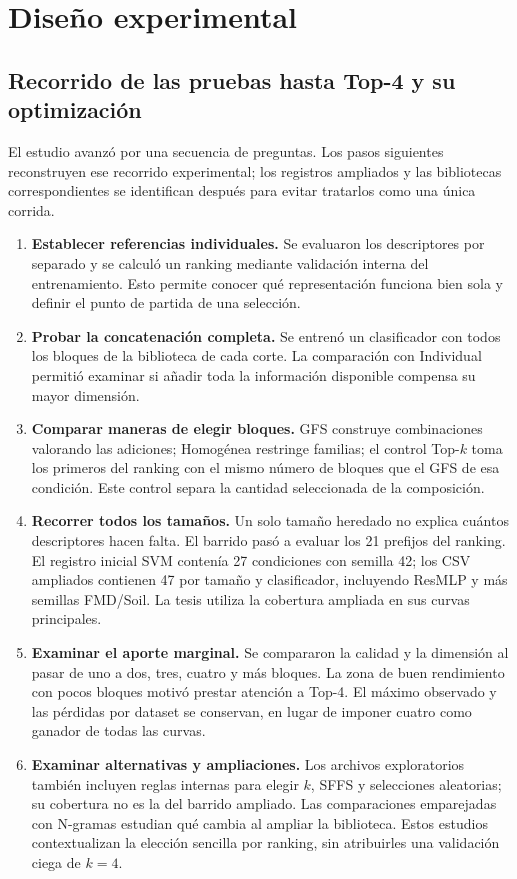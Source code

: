 \chapter{Diseño experimental}\label{sec:diseno}

\section{Recorrido de las pruebas hasta Top-4 y su optimización}
El estudio avanzó por una secuencia de preguntas. Los pasos siguientes reconstruyen ese recorrido experimental; los registros ampliados y las bibliotecas correspondientes se identifican después para evitar tratarlos como una única corrida.
\begin{enumerate}
\item \textbf{Establecer referencias individuales.} Se evaluaron los descriptores por separado y se calculó un ranking mediante validación interna del entrenamiento. Esto permite conocer qué representación funciona bien sola y definir el punto de partida de una selección.
\item \textbf{Probar la concatenación completa.} Se entrenó un clasificador con todos los bloques de la biblioteca de cada corte. La comparación con Individual permitió examinar si añadir toda la información disponible compensa su mayor dimensión.
\item \textbf{Comparar maneras de elegir bloques.} GFS construye combinaciones valorando las adiciones; Homogénea restringe familias; el control Top-\(k\) toma los primeros del ranking con el mismo número de bloques que el GFS de esa condición. Este control separa la cantidad seleccionada de la composición.
\item \textbf{Recorrer todos los tamaños.} Un solo tamaño heredado no explica cuántos descriptores hacen falta. El barrido pasó a evaluar los 21 prefijos del ranking. El registro inicial SVM contenía 27 condiciones con semilla 42; los CSV ampliados contienen 47 por tamaño y clasificador, incluyendo ResMLP y más semillas FMD/Soil. La tesis utiliza la cobertura ampliada en sus curvas principales.
\item \textbf{Examinar el aporte marginal.} Se compararon la calidad y la dimensión al pasar de uno a dos, tres, cuatro y más bloques. La zona de buen rendimiento con pocos bloques motivó prestar atención a Top-4. El máximo observado y las pérdidas por dataset se conservan, en lugar de imponer cuatro como ganador de todas las curvas.
\item \textbf{Examinar alternativas y ampliaciones.} Los archivos exploratorios también incluyen reglas internas para elegir \(k\), SFFS y selecciones aleatorias; su cobertura no es la del barrido ampliado. Las comparaciones emparejadas con N-gramas estudian qué cambia al ampliar la biblioteca. Estos estudios contextualizan la elección sencilla por ranking, sin atribuirles una validación ciega de \(k=4\).

\end{enumerate}
